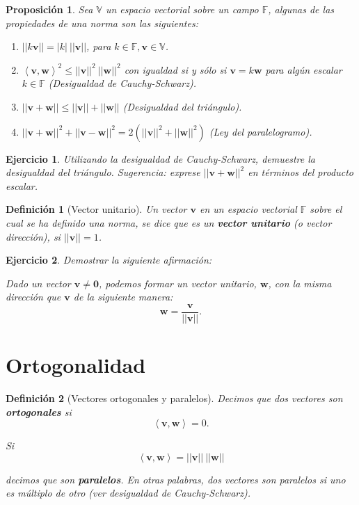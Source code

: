 \documentclass[11pt]{report}
\theoremstyle{break}
\newtheorem{definicion}{Definición}[chapter]
\newtheorem{proposicion}{Proposición}[chapter]
\newtheorem{ejercicio}{Ejercicio}[chapter]
\theoremstyle{break}
\newcommand{\mbb}[1]{$\mathbb{#1}$}
\begin{document}
\begin{proposicion}
Sea \mbb{V} un espacio vectorial sobre un campo \mbb{F}, algunas de las propiedades de una norma son las siguientes:

\begin{enumerate}[label = \alph*)]
\item $||k \bm{v}|| = |k|\medspace ||\bm{v}||$, para $k \in \mathbb{F}, \bm{v} \in \mathbb{V}$. 

\item $\left< \bm{v}, \bm{w} \right>^{2} \leq ||\bm{v}||^{2} \medspace ||\bm{w}||^{2}$ con igualdad si y sólo si $\bm{v} = k\bm{w}$ para algún escalar $k \in \mathbb{F}$ (Desigualdad de Cauchy-Schwarz).

\item $||\bm{v} + \bm{w} || \leq ||\bm{v}|| + ||\bm{w}||$ (Desigualdad del triángulo).

\item $||\bm{v} + \bm{w}||^2 + ||\bm{v} - \bm{w}||^2 = 2(||\bm{v}||^2 + ||\bm{w}||^2)$ (Ley del paralelogramo).
\end{enumerate}
\end{proposicion}

\begin{ejercicio}
Utilizando la desigualdad de Cauchy-Schwarz, demuestre la desigualdad del triángulo.\newline
Sugerencia: exprese $|| \bm{v} + \bm{w} ||^2$ en términos del producto escalar.
\end{ejercicio}

\begin{definicion}[Vector unitario]
\label{definicion:vector unitario}
Un vector $\bm{v}$ en un espacio vectorial \mbb{F} sobre el cual se ha definido una norma, se dice que es un \textbf{vector unitario} (o vector dirección), si $||\bm{v}|| = 1$.
\end{definicion}

\begin{ejercicio}
Demostrar la siguiente afirmación:

Dado un vector $\bm{v} \neq \bm{0}$, podemos formar un vector unitario, $\bm{w}$, con la misma dirección que $\bm{v}$ de la siguiente manera:
$$ \bm{w} = \dfrac{\bm{v}}{||\bm{v}||}.$$
\end{ejercicio}

\section{Ortogonalidad}
\label{seccion:ortogonalidad}
\begin{definicion}[Vectores ortogonales y paralelos]
Decimos que dos vectores son \textbf{ortogonales} si 
$$ \left<\bm{v}, \bm{w} \right> = 0.$$

Si
$$ \left<\bm{v}, \bm{w} \right> = ||\bm{v}|| \medspace ||\bm{w}||$$

decimos que son \textbf{paralelos}. En otras palabras, dos vectores son paralelos si uno es múltiplo de otro (ver desigualdad de Cauchy-Schwarz).
\end{definicion}
\end{document}
